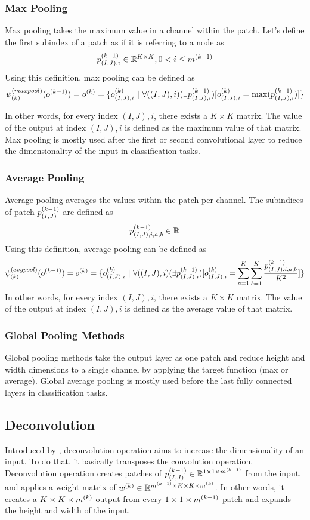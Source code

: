 \subsubsection{Max Pooling}
Max pooling takes the maximum value in a channel within the patch. Let's define the first subindex of a patch as if it is referring to a node as
$$ p^{(k-1)}_{(I,J),i} \in \mathbb{R}^{K \times K}, 0 < i \leq m^{(k-1)} $$
Using this definition, max pooling can be defined as
$$ \psi^{(maxpool)}_{(k)}(o^{(k-1)}) = o^{(k)} = \{ o^{(k)}_{(I,J),i} \ | \ \forall ((I,J),i) (\exists p^{(k-1)}_{(I,J),i}) [o^{(k)}_{(I,J),i} = \max(p^{(k-1)}_{(I,J),i})]  \}  $$

In other words, for every index $(I,J),i$, there exists a $K \times K$ matrix. The value of the output at index $(I,J),i$ is defined as the maximum value of that matrix. Max pooling is mostly used after the first or second convolutional layer to reduce the dimensionality of the input in classification tasks.

\subsubsection{Average Pooling}
Average pooling averages the values within the patch per channel. The subindices of patch $p^{(k-1)}_{(I,J)}$ are defined as
$$ p^{(k-1)}_{(I,J),i,a,b} \in \mathbb{R}^{} $$
Using this definition, average pooling can be defined as
$$ \psi^{(avgpool)}_{(k)}(o^{(k-1)}) = o^{(k)} = \{o^{(k)}_{(I,J),i}  \ | \ \forall ((I,J),i) (\exists p^{(k-1)}_{(I,J),i}) [o^{(k)}_{(I,J),i} = \sum_{a=1}^{K}\sum_{b=1}^{K}\frac{p^{(k-1)}_{(I,J),i,a,b}}{K^2} ]\} $$
In other words, for every index $(I,J),i$, there exists a $K \times K$ matrix. The value of the output at index $(I,J),i$ is defined as the average value of that matrix. 

\subsubsection{Global Pooling Methods}
Global pooling methods take the output layer as one patch and reduce height and width dimensions to a single channel by applying the target function (max or average). Global average pooling is mostly used before the last fully connected layers in classification tasks.

\subsection{Deconvolution}
Introduced by \cite{zeiler2010deconvolutional}, deconvolution operation aims to increase the dimensionality of an input. To do that, it basically transposes the convolution operation. Deconvolution operation creates patches of $p^{(k-1)}_{(I,J)} \in \mathbb{R}^{1 \times 1 \times m^{(k-1)}}$ from the input, and applies a weight matrix of $w^{(k)} \in \mathbb{R}^{m^{(k-1)} \times K \times K \times m^{(k)}}$. In other words, it creates a $K \times K \times m^{(k)}$ output from every $1 \times 1 \times m^{(k-1)}$ patch and expands the height and width of the input. 

